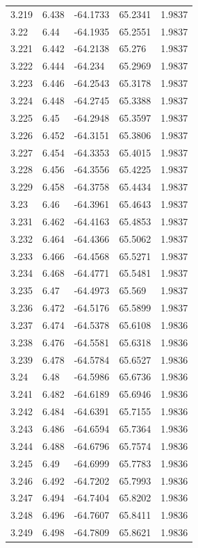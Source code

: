 \begin{tabular}{lllll}
3.219 & 6.438 & -64.1733 & 65.2341 & 1.9837 \\
3.22 & 6.44 & -64.1935 & 65.2551 & 1.9837 \\
3.221 & 6.442 & -64.2138 & 65.276 & 1.9837 \\
3.222 & 6.444 & -64.234 & 65.2969 & 1.9837 \\
3.223 & 6.446 & -64.2543 & 65.3178 & 1.9837 \\
3.224 & 6.448 & -64.2745 & 65.3388 & 1.9837 \\
3.225 & 6.45 & -64.2948 & 65.3597 & 1.9837 \\
3.226 & 6.452 & -64.3151 & 65.3806 & 1.9837 \\
3.227 & 6.454 & -64.3353 & 65.4015 & 1.9837 \\
3.228 & 6.456 & -64.3556 & 65.4225 & 1.9837 \\
3.229 & 6.458 & -64.3758 & 65.4434 & 1.9837 \\
3.23 & 6.46 & -64.3961 & 65.4643 & 1.9837 \\
3.231 & 6.462 & -64.4163 & 65.4853 & 1.9837 \\
3.232 & 6.464 & -64.4366 & 65.5062 & 1.9837 \\
3.233 & 6.466 & -64.4568 & 65.5271 & 1.9837 \\
3.234 & 6.468 & -64.4771 & 65.5481 & 1.9837 \\
3.235 & 6.47 & -64.4973 & 65.569 & 1.9837 \\
3.236 & 6.472 & -64.5176 & 65.5899 & 1.9837 \\
3.237 & 6.474 & -64.5378 & 65.6108 & 1.9836 \\
3.238 & 6.476 & -64.5581 & 65.6318 & 1.9836 \\
3.239 & 6.478 & -64.5784 & 65.6527 & 1.9836 \\
3.24 & 6.48 & -64.5986 & 65.6736 & 1.9836 \\
3.241 & 6.482 & -64.6189 & 65.6946 & 1.9836 \\
3.242 & 6.484 & -64.6391 & 65.7155 & 1.9836 \\
3.243 & 6.486 & -64.6594 & 65.7364 & 1.9836 \\
3.244 & 6.488 & -64.6796 & 65.7574 & 1.9836 \\
3.245 & 6.49 & -64.6999 & 65.7783 & 1.9836 \\
3.246 & 6.492 & -64.7202 & 65.7993 & 1.9836 \\
3.247 & 6.494 & -64.7404 & 65.8202 & 1.9836 \\
3.248 & 6.496 & -64.7607 & 65.8411 & 1.9836 \\
3.249 & 6.498 & -64.7809 & 65.8621 & 1.9836 \\

\end{tabular}
